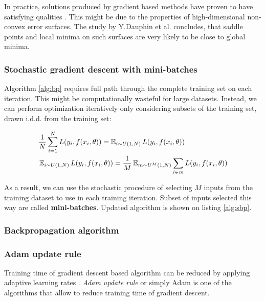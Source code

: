 In practice, solutions produced by gradient based methods have proven to have satisfying qualities \cite{Szegedy2016,He2015}.
This might be due to the properties of high-dimensional non-convex error surfaces. The study by Y.Dauphin et al. \cite{Dauphin14} concludes, that saddle points and local minima on such surfaces are very likely to be close to global minima.

\subsubsection{Stochastic gradient descent with mini-batches}

Algorithm \ref{alg:bp} requires full path through the complete training set on each iteration.
This might be computationally wasteful for large datasets. Instead, we can perform optimization iteratively only considering subsets of the training set, drawn i.d.d. from the training set:

\begin{equation*}\label{eq:sopt}
  \begin{aligned}
  & \frac{1}{N} \sum_{i=1}^{N} L(y_i, f(x_i, \theta)) = \operatorname{\mathbb{E}}_{i \sim U(1,N) } L(y_i, f(x_i, \theta)) \\
  & \operatorname{\mathbb{E}}_{i \sim U(1,N) } L(y_i, f(x_i, \theta))= \frac{1}{M} \operatorname{\mathbb{E}}_{m \sim U^M(1,N) } \sum_{i \in m} L(y_i, f(x_i, \theta))
  \end{aligned}
\end{equation*}

As a result, we can use the stochastic procedure of selecting $M$ inputs from the training dataset to use in each training iteration.
Subset of inputs selected this way are called \textbf{mini-batches}. Updated algorithm is shown on listing \ref{alg:sbp}.



\subsubsection{Backpropagation algorithm}

\subsubsection{Adam update rule}

Training time of gradient descent based algorithm can be reduced by applying adaptive learning rates \cite{Kingma2015}.
\textit{Adam update rule} or simply Adam is one of the algorithms that allow to reduce training time of gradient descent.

